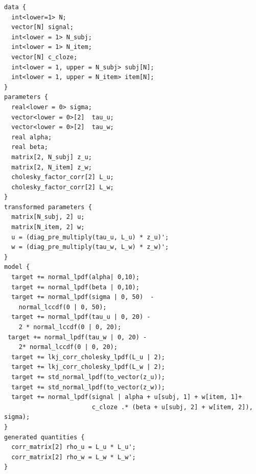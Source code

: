 \documentclass[12pt,]{krantz}
\newenvironment{Shaded}{\begin{snugshade}}{\end{snugshade}}
\newcommand{\KeywordTok}[1]{\textcolor[rgb]{0.13,0.29,0.53}{\textbf{#1}}}
\newcommand{\DataTypeTok}[1]{\textcolor[rgb]{0.13,0.29,0.53}{#1}}
\newcommand{\StringTok}[1]{\textcolor[rgb]{0.31,0.60,0.02}{#1}}
\newcommand{\OperatorTok}[1]{\textcolor[rgb]{0.81,0.36,0.00}{\textbf{#1}}}
\newcommand{\NormalTok}[1]{#1}
\theoremstyle{definition}
\theoremstyle{definition}
\theoremstyle{definition}
\theoremstyle{remark}
\begin{document}
\begin{verbatim}
data {
  int<lower=1> N;
  vector[N] signal;
  int<lower = 1> N_subj;
  int<lower = 1> N_item;
  vector[N] c_cloze;
  int<lower = 1, upper = N_subj> subj[N]; 
  int<lower = 1, upper = N_item> item[N]; 
}
parameters {
  real<lower = 0> sigma;
  vector<lower = 0>[2]  tau_u;   
  vector<lower = 0>[2]  tau_w;   
  real alpha;
  real beta;
  matrix[2, N_subj] z_u;
  matrix[2, N_item] z_w;
  cholesky_factor_corr[2] L_u;
  cholesky_factor_corr[2] L_w;
}
transformed parameters {
  matrix[N_subj, 2] u;
  matrix[N_item, 2] w;
  u = (diag_pre_multiply(tau_u, L_u) * z_u)';
  w = (diag_pre_multiply(tau_w, L_w) * z_w)';
}
model {
  target += normal_lpdf(alpha| 0,10);
  target += normal_lpdf(beta | 0,10);
  target += normal_lpdf(sigma | 0, 50)  -
    normal_lccdf(0 | 0, 50);
  target += normal_lpdf(tau_u | 0, 20) -
    2 * normal_lccdf(0 | 0, 20);
 target += normal_lpdf(tau_w | 0, 20) -
    2* normal_lccdf(0 | 0, 20);
  target += lkj_corr_cholesky_lpdf(L_u | 2);
  target += lkj_corr_cholesky_lpdf(L_w | 2);
  target += std_normal_lpdf(to_vector(z_u));
  target += std_normal_lpdf(to_vector(z_w));
  target += normal_lpdf(signal | alpha + u[subj, 1] + w[item, 1]+
                        c_cloze .* (beta + u[subj, 2] + w[item, 2]), sigma);
}
generated quantities {
  corr_matrix[2] rho_u = L_u * L_u';
  corr_matrix[2] rho_w = L_w * L_w';
}
\end{verbatim}

\begin{Shaded}
\end{Shaded}
\end{document}
